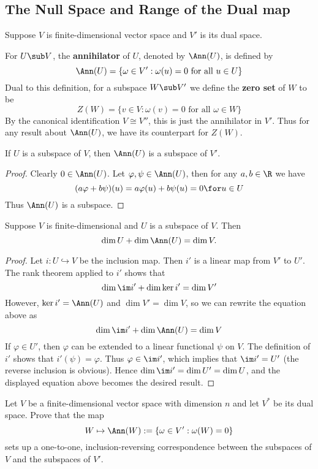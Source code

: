 \subsection{The Null Space and Range of the Dual map}
Suppose $V$ is finite-dimensional vector space and $V'$ is its dual space.
\begin{definition}
For $U\sub V$, the \textbf{annihilator} of $U$, denoted by $\Ann(U)$, is defined by
\[\Ann(U)=\{\omega\in V':\omega(u)=0\text{ for all }u\in U\}\]
Dual to this definition, for a subspace $W\sub V'$ we define the \textbf{zero set} of $W$ to be
\[Z(W)=\{v\in V:\omega(v)=0\text{ for all }\omega\in W\}\]
By the canonical identification $V\cong V''$, this is just the annihilator in $V'$. Thus for any result about $\Ann(U)$, we have its counterpart for $Z(W)$.
\end{definition}
\begin{proposition}
If $U$ is a subspace of $V$, then $\Ann(U)$ is a subspace of $V'$.
\end{proposition}
\begin{proof}
Clearly $0\in\Ann(U)$. Let $\varphi,\psi\in\Ann(U)$, then for any $a,b\in\R$ we have 
\[(a\varphi+b\psi)(u)=a\varphi(u)+b\psi(u)=0\for u\in U\]
Thus $\Ann(U)$ is a subspace.
\end{proof}
\begin{proposition}\label{dual space ann dim}
Suppose $V$ is finite-dimensional and $U$ is a subspace of $V$. Then
\[\dim U+\dim\Ann(U)=\dim V.\]
\end{proposition}
\begin{proof}
Let $i:U\hookrightarrow V$ be the inclusion map. Then $i'$ is a linear map from $V'$ to $U'$. The rank theorem applied to $i'$ shows that
\[\dim\im i'+\dim\ker i'=\dim V'\]
However, $\ker i'=\Ann(U)$ and $\dim V'=\dim V$, so we can rewrite the equation above as
\[\dim\im i'+\dim\Ann(U)=\dim V\]
If $\varphi\in U'$, then $\varphi$ can be extended to a linear functional $\psi$ on $V$. The definition of $i'$ shows that $i'(\psi)=\varphi$. Thus $\varphi\in\im i'$, which implies that $\im i'=U'$ (the reverse inclusion is obvious). Hence $\dim\im i'=\dim U'=\dim U$, and the displayed equation above becomes the desired result.
\end{proof}
\begin{proposition}
Let $V$ be a finite-dimensional vector space with dimension $n$ and let $V^*$ be its dual space. Prove that the map
\[W\mapsto \Ann(W):=\{\omega\in V':\omega(W)=0\}\]
sets up a one-to-one, inclusion-reversing correspondence between the subspaces of $V$ and the subspaces of $V'$.
\end{proposition}
